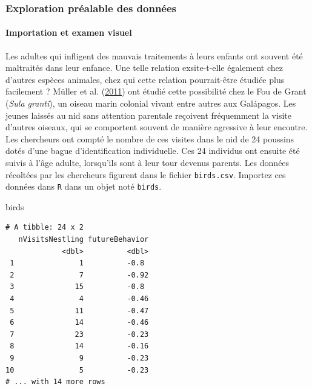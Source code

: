 \documentclass[a4paperpaper,]{article}
\newenvironment{Shaded}{\begin{snugshade}}{\end{snugshade}}
\newcommand{\NormalTok}[1]{\textcolor[rgb]{0.12,0.11,0.11}{#1}}
\let\oldparagraph\paragraph
\renewcommand{\paragraph}[1]{\oldparagraph{#1}\mbox{}}
\begin{document}
\hypertarget{exploration-prealable-des-donnees-2}{%
\subsubsection{Exploration préalable des données}\label{exploration-prealable-des-donnees-2}}

\hypertarget{importation-et-examen-visuel-4}{%
\paragraph{Importation et examen visuel}\label{importation-et-examen-visuel-4}}

Les adultes qui infligent des mauvais traitements à leurs enfants ont souvent été maltraités dans leur enfance. Une telle relation exsite-t-elle également chez d'autres espèces animales, chez qui cette relation pourrait-être étudiée plus facilement ? Müller et al. (\protect\hyperlink{ref-muller2011}{2011}) ont étudié cette possibilité chez le Fou de Grant (\emph{Sula granti}), un oiseau marin colonial vivant entre autres aux Galápagos. Les jeunes laissés au nid sans attention parentale reçoivent fréquemment la visite d'autres oiseaux, qui se comportent souvent de manière agressive à leur encontre. Les chercheurs ont compté le nombre de ces visites dans le nid de 24 poussins dotés d'une bague d'identification individuelle. Ces 24 individus ont ensuite été suivis à l'âge adulte, lorsqu'ils sont à leur tour devenus parents. Les données récoltées par les chercheurs figurent dans le fichier \texttt{birds.csv}. Importez ces données dans \texttt{R} dans un objet noté \texttt{birds}.

\begin{Shaded}
\begin{Highlighting}[]
\NormalTok{birds}
\end{Highlighting}
\end{Shaded}

\begin{verbatim}
# A tibble: 24 x 2
   nVisitsNestling futureBehavior
             <dbl>          <dbl>
 1               1          -0.8 
 2               7          -0.92
 3              15          -0.8 
 4               4          -0.46
 5              11          -0.47
 6              14          -0.46
 7              23          -0.23
 8              14          -0.16
 9               9          -0.23
10               5          -0.23
# ... with 14 more rows
\end{verbatim}
\end{document}
